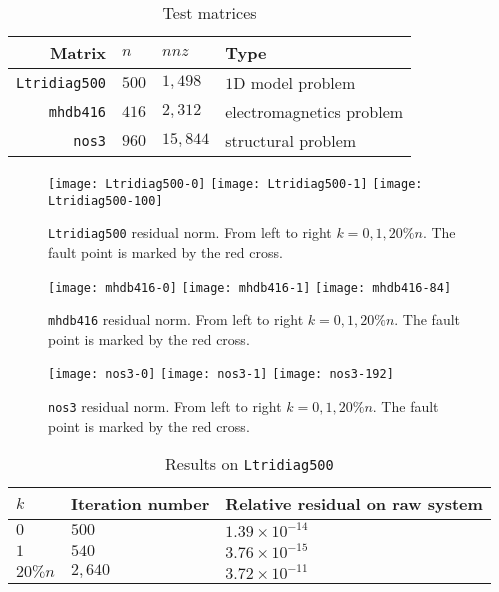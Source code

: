 \documentclass[11pt]{article}
\begin{document}
\begin{table}[tb]
\caption{Test matrices}
\label{table:test-matrix}
\begin{center}
\begin{tabularx}{0.7\linewidth}{rXXl}
\toprule
  Matrix & $n$ & $nnz$ & Type \\
\midrule
  {\tt Ltridiag500} & $500$ & $1,498$ & $1$D model problem \\
  {\tt mhdb416} & $416$ & $2,312$ & electromagnetics problem\\
  {\tt nos3} & $960$ & $15,844$ & structural problem \\
\bottomrule
 \end{tabularx}
\end{center}

\end{table}

\begin{figure}[t]
  \centering 
  \texttt{[image: Ltridiag500-0]}
  \texttt{[image: Ltridiag500-1]}
  \texttt{[image: Ltridiag500-100]}
  \caption{{{\tt Ltridiag500} residual norm. From left to right $k=0,1,20\%n$. The fault point is marked by the red cross.}}
  \label{figure:residual-norm-Ltridiag500}
  \vspace{\baselineskip}
  
  \texttt{[image: mhdb416-0]}
  \texttt{[image: mhdb416-1]}
  \texttt{[image: mhdb416-84]}
  \caption{{{\tt mhdb416} residual norm. From left to right $k=0,1,20\%n$. The fault point is marked by the red cross.}}
  \label{figure:residual-norm-mhdb416}
\vspace{\baselineskip}

  \texttt{[image: nos3-0]}
  \texttt{[image: nos3-1]}
  \texttt{[image: nos3-192]}
  \caption{{{\tt nos3} residual norm. From left to right $k=0,1,20\%n$. The fault point is marked by the red cross.}}
  \label{figure:residual-norm-nos3}
\end{figure}

\begin{table}[t]
\caption{{Results on {\tt Ltridiag500}}}
\begin{center}
\begin{tabular}{lll}
  \toprule
  $k$ & Iteration number & Relative residual on raw system\\
  \midrule
  $0$ & $500$ & $1.39\times 10^{-14}$ \\
  $1$ & $540$ & $3.76\times 10^{-15}$ \\
  $20\%n$ & $2,640$ & $3.72\times 10^{-11}$\\
  \bottomrule
 \end{tabular}
\end{center}
\label{table:Ltridiag500}
\end{table}
\end{document}
